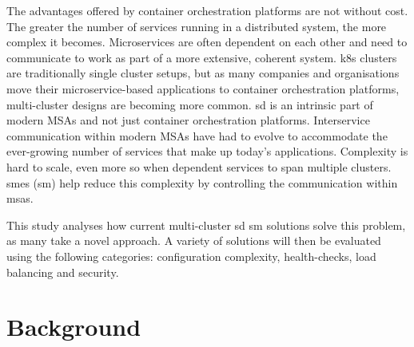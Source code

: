 \documentclass[12pt, a4paper, oneside]{article}
\begin{document}
The advantages offered by container orchestration platforms are not without cost. The greater the number of services running in a distributed system, the more complex it becomes. Microservices are often dependent on each other and need to communicate to work as part of a more extensive, coherent system. \acrshort{k8s} clusters are traditionally single cluster setups, but as many companies and organisations move their microservice-based applications to container orchestration platforms, multi-cluster designs are becoming more common. \acrshort{sd} is an intrinsic part of modern MSAs and not just container orchestration platforms. Interservice communication within modern MSAs have had to evolve to accommodate the ever-growing number of services that make up today’s applications. Complexity is hard to scale, even more so when dependent services to span multiple clusters. \acrlong{sm}es (\acrshort{sm}) help reduce this complexity by controlling the communication within \acrshort{msa}s.   

This study analyses how current multi-cluster \acrshort{sd} \acrshort{sm} solutions solve this problem, as many take a novel approach. A variety of solutions will then be evaluated using the following categories: configuration complexity, health-checks, load balancing and security.
\newpage

\section{Background}
\end{document}
